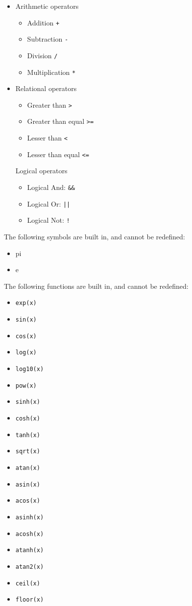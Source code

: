 \documentclass[draftspec]{ninemlspec}
\begin{document}
\begin{itemize}
\item Arithmetic operators
\begin{itemize}
\item Addition \verb|+|
\item Subtraction \verb|-|
\item Division \verb|/|
\item Multiplication \verb|*|
\end{itemize}

\item Relational operators
\begin{itemize}
\item Greater than \verb|>|
\item Greater than equal \verb|>=|
\item Lesser than \verb|<|
\item Lesser than equal \verb|<=|
\end{itemize}

Logical operators
\begin{itemize}
\item Logical And: \verb|&&|
\item Logical Or:  \verb+||+
\item Logical Not: \verb|!|
\end{itemize}

\end{itemize}

The following symbols are built in, and cannot be redefined:
\begin{itemize}
\item pi
\item e
\end{itemize}


The following functions are built in, and cannot be redefined:
\begin{itemize}
\item \verb|exp(x)|
\item \verb|sin(x)|
\item \verb|cos(x)|
\item \verb|log(x)|
\item \verb|log10(x)|
\item \verb|pow(x)|
\item \verb|sinh(x)|
\item \verb|cosh(x)|
\item \verb|tanh(x)|
\item \verb|sqrt(x)|
\item \verb|atan(x)|
\item \verb|asin(x)|
\item \verb|acos(x)|
\item \verb|asinh(x)|
\item \verb|acosh(x)|
\item \verb|atanh(x)|
\item \verb|atan2(x)|
\item \verb|ceil(x)|
\item \verb|floor(x)|
\end{itemize}
\end{document}

